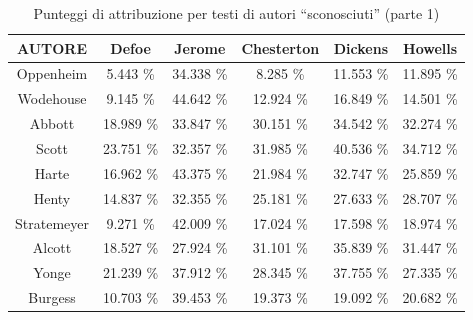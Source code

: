 \documentclass[titlepage]{article}
\begin{document}
\begin{table}[htp]
\centering
\footnotesize
\begin{tabular}{cccccc}
    \toprule
    \textbf{AUTORE} & \textbf{Defoe} & \textbf{Jerome} & \textbf{Chesterton} & \textbf{Dickens} & \textbf{Howells} \\
    
    \midrule
    Oppenheim & 5.443 \% & 34.338 \% & 8.285 \% & 11.553 \% & 11.895 \% \\
    
    \midrule
    Wodehouse & 9.145 \% & 44.642 \% & 12.924 \% & 16.849 \% & 14.501 \% \\
    
    \midrule
    Abbott & 18.989 \% & 33.847 \% & 30.151 \% & 34.542 \% & 32.274 \% \\
    
    \midrule
    Scott & 23.751 \% & 32.357 \% & 31.985 \% & 40.536 \% & 34.712 \% \\
    
    \midrule
    Harte & 16.962 \% & 43.375 \% & 21.984 \% & 32.747 \% & 25.859 \% \\
    
    \midrule
    Henty & 14.837 \% & 32.355 \% & 25.181 \% & 27.633 \% & 28.707 \% \\
    
    \midrule
    Stratemeyer & 9.271 \% & 42.009 \% & 17.024 \% & 17.598 \% & 18.974 \% \\
    
    \midrule
    Alcott & 18.527 \% & 27.924 \% & 31.101 \% & 35.839 \% & 31.447 \% \\
    
    \midrule
    Yonge & 21.239 \% & 37.912 \% & 28.345 \% & 37.755 \% & 27.335 \% \\
    
    \midrule
    Burgess & 10.703 \% & 39.453 \% & 19.373 \% & 19.092 \% & 20.682 \% \\
    
    \bottomrule
\end{tabular}
\caption{Punteggi di attribuzione per testi di autori ``sconosciuti'' (parte 1)}
\end{table}
\newpage
\end{document}
